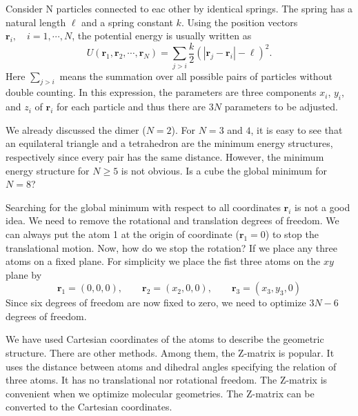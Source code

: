 \bigskip
\begin{example}\label{ex:global_harmonic_coupling}
Consider N particles connected to eac other by identical springs.  The spring has a natural length $\ell$ and a spring constant $k$.   Using the position vectors $\mathbf{r}_i, \quad i=1,\cdots,N$, the potential energy is usually written as
\begin{equation}\label{eq:U_all_pairs}
U(\mathbf{r}_1, \mathbf{r}_2, \cdots, \mathbf{r}_N) = \sum_{j>i} \frac{k}{2} (\left |\mathbf{r}_j-\mathbf{r}_i \right | - \ell )^2.
\end{equation}
Here $\sum_{j>i}$ means the summation over all possible pairs of particles without double counting.  In this expression, the parameters are three components $x_i$, $y_i$, and $z_i$ of $\mathbf{r}_i$ for each particle and thus there are $3N$ parameters to be adjusted. 

We already discussed the dimer ($N=2$).  For $N=3$ and $4$, it is easy to see that an equilateral triangle and a tetrahedron are the minimum energy structures, respectively since every pair has the same distance. However, the minimum energy structure for $N \ge 5$ is not obvious.  Is a cube the global minimum for $N=8$?

Searching for the global minimum with respect to all coordinates $\mathbf{r}_i$ is not
a good idea.  We need to remove the rotational and translation degrees of freedom.  We can always put the atom 1 at the origin of coordinate ($\mathbf{r}_1=0$) to stop the translational motion.  Now, how do we stop the rotation?   If we place any three atoms on a fixed plane. For simplicity we place the fist three atoms on the $xy$ plane by 
\begin{equation}
\mathbf{r}_1=(0,0,0), \qquad \mathbf{r}_2=(x_2,0,0), \qquad \mathbf{r}_3 = (x_3, y_3, 0)
\end{equation}
Since six degrees of freedom are now fixed to zero, we need to optimize $3N-6$ degrees of freedom.

We have used Cartesian coordinates of the atoms to describe the geometric structure.  There are other methods.  Among them, the Z-matrix is popular. It uses the distance between atoms and dihedral angles specifying the relation of three atoms.  It has no translational nor rotational freedom. The Z-matrix is convenient when we optimize molecular geometries.\cite{z-matrix}   The Z-matrix can be converted to the Cartesian coordinates. 

  
\end{example}

